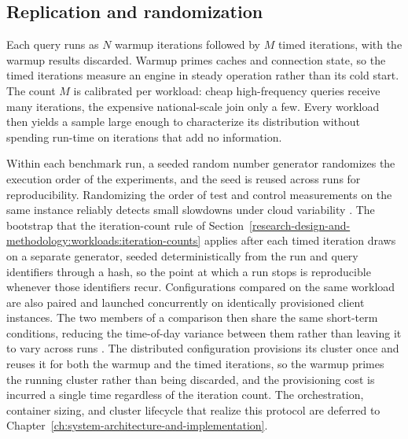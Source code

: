 \subsection{Replication and randomization}
\label{research-design-and-methodology:overview-and-experimental-design:replication-and-randomization}

Each query runs as $N$ warmup iterations followed by $M$ timed iterations, with the warmup results discarded. Warmup primes caches and connection state, so the timed iterations measure an engine in steady operation rather than its cold start. The count $M$ is calibrated per workload: cheap high-frequency queries receive many iterations, the expensive national-scale join only a few. Every workload then yields a sample large enough to characterize its distribution without spending run-time on iterations that add no information.

Within each benchmark run, a seeded random number generator randomizes the execution order of the experiments, and the seed is reused across runs for reproducibility. Randomizing the order of test and control measurements on the same instance reliably detects small slowdowns under cloud variability \parencite{laaber2019_software_microbenchmarking_cloud}. The bootstrap that the iteration-count rule of Section~\ref{research-design-and-methodology:workloads:iteration-counts} applies after each timed iteration draws on a separate generator, seeded deterministically from the run and query identifiers through a hash, so the point at which a run stops is reproducible whenever those identifiers recur. Configurations compared on the same workload are also paired and launched concurrently on identically provisioned client instances. The two members of a comparison then share the same short-term conditions, reducing the time-of-day variance between them rather than leaving it to vary across runs \parencite{laaber2019_software_microbenchmarking_cloud}. The distributed configuration provisions its cluster once and reuses it for both the warmup and the timed iterations, so the warmup primes the running cluster rather than being discarded, and the provisioning cost is incurred a single time regardless of the iteration count. The orchestration, container sizing, and cluster lifecycle that realize this protocol are deferred to Chapter~\ref{ch:system-architecture-and-implementation}.